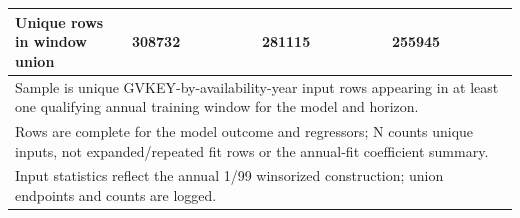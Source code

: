 \begin{tabular}{l*{3}{ccccc}}
\hline
Unique rows in window union&      308732&            &            &            &            &      281115&            &            &            &            &      255945&            &            &            &            \\
\hline\hline
\multicolumn{16}{l}{\footnotesize Sample is unique GVKEY-by-availability-year input rows appearing in at least one qualifying annual training window for the model and horizon.}\\
\multicolumn{16}{l}{\footnotesize Rows are complete for the model outcome and regressors; N counts unique inputs, not expanded/repeated fit rows or the annual-fit coefficient summary.}\\
\multicolumn{16}{l}{\footnotesize Input statistics reflect the annual 1/99 winsorized construction; union endpoints and counts are logged.}\\
\end{tabular}
